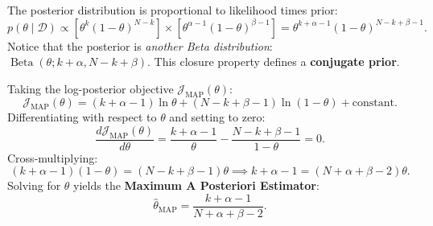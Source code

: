 \begin{enumerate}
  The posterior distribution is proportional to likelihood times prior:
  \begin{equation}
  p(\theta \mid \mathcal{D}) \propto \left[ \theta^k (1 - \theta)^{N - k} \right] \times \left[ \theta^{\alpha - 1} (1 - \theta)^{\beta - 1} \right] = \theta^{k + \alpha - 1} (1 - \theta)^{N - k + \beta - 1}.
  \end{equation}
  Notice that the posterior is \emph{another Beta distribution}: $\operatorname{Beta}(\theta; k + \alpha, N - k + \beta)$. This closure property defines a \textbf{conjugate prior}.
  
  Taking the log-posterior objective $\mathcal{J}_{\text{MAP}}(\theta)$:
  \begin{equation}
  \mathcal{J}_{\text{MAP}}(\theta) = (k + \alpha - 1) \ln \theta + (N - k + \beta - 1) \ln (1 - \theta) + \text{constant}.
  \end{equation}
  Differentiating with respect to $\theta$ and setting to zero:
  \begin{equation}
  \frac{d \mathcal{J}_{\text{MAP}}(\theta)}{d\theta} = \frac{k + \alpha - 1}{\theta} - \frac{N - k + \beta - 1}{1 - \theta} = 0.
  \end{equation}
  Cross-multiplying:
  \begin{equation}
  (k + \alpha - 1)(1 - \theta) = (N - k + \beta - 1)\theta \implies k + \alpha - 1 = (N + \alpha + \beta - 2)\theta.
  \end{equation}
  Solving for $\theta$ yields the \textbf{Maximum A Posteriori Estimator}:
  \begin{equation}
  \hat{\theta}_{\text{MAP}} = \frac{k + \alpha - 1}{N + \alpha + \beta - 2}.
  \label{eq:map_bernoulli_solution}
  \end{equation}
\end{enumerate}


